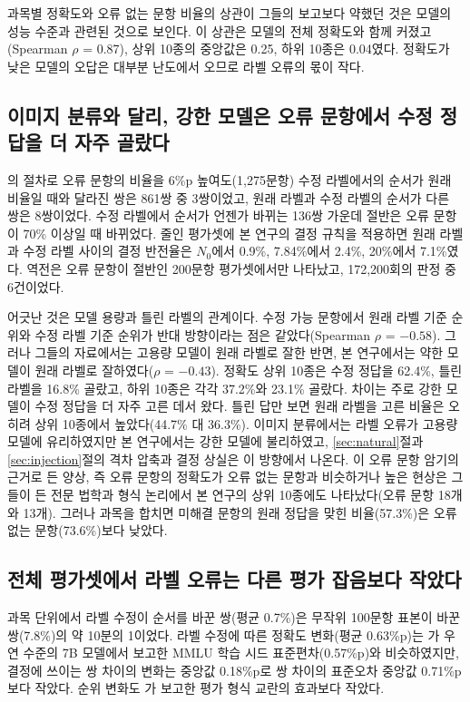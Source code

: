 \documentclass[11pt]{article}
\begin{document}
과목별 정확도와 오류 없는 문항 비율의 상관이 그들의 보고보다 약했던 것은 모델의 성능 수준과 관련된 것으로 보인다. 이 상관은 모델의 전체 정확도와 함께 커졌고(Spearman $\rho$ = 0.87), 상위 10종의 중앙값은 0.25, 하위 10종은 0.04였다. 정확도가 낮은 모델의 오답은 대부분 난도에서 오므로 라벨 오류의 몫이 작다.

\subsection{이미지 분류와 달리, 강한 모델은 오류 문항에서 수정 정답을 더 자주 골랐다}
\label{sec:capacity}

\citet{northcutt2021pervasive}의 절차로 오류 문항의 비율을 6\%p 높여도(1,275문항) 수정 라벨에서의 순서가 원래 비율일 때와 달라진 쌍은 861쌍 중 3쌍이었고, 원래 라벨과 수정 라벨의 순서가 다른 쌍은 8쌍이었다. 수정 라벨에서 순서가 언젠가 바뀌는 136쌍 가운데 절반은 오류 문항이 70\% 이상일 때 바뀌었다. 줄인 평가셋에 본 연구의 결정 규칙을 적용하면 원래 라벨과 수정 라벨 사이의 결정 반전율은 $N_0$에서 0.9\%, 7.84\%에서 2.4\%, 20\%에서 7.1\%였다. 역전은 오류 문항이 절반인 200문항 평가셋에서만 나타났고, 172,200회의 판정 중 6건이었다.

어긋난 것은 모델 용량과 틀린 라벨의 관계이다. 수정 가능 문항에서 원래 라벨 기준 순위와 수정 라벨 기준 순위가 반대 방향이라는 점은 같았다(Spearman $\rho$ = $-0.58$). 그러나 그들의 자료에서는 고용량 모델이 원래 라벨로 잘한 반면, 본 연구에서는 약한 모델이 원래 라벨로 잘하였다($\rho$ = $-0.43$). 정확도 상위 10종은 수정 정답을 62.4\%, 틀린 라벨을 16.8\% 골랐고, 하위 10종은 각각 37.2\%와 23.1\% 골랐다. 차이는 주로 강한 모델이 수정 정답을 더 자주 고른 데서 왔다. 틀린 답만 보면 원래 라벨을 고른 비율은 오히려 상위 10종에서 높았다(44.7\% 대 36.3\%). 이미지 분류에서는 라벨 오류가 고용량 모델에 유리하였지만 본 연구에서는 강한 모델에 불리하였고, \ref{sec:natural}절과 \ref{sec:injection}절의 격차 압축과 결정 상실은 이 방향에서 나온다. \citet{gema-etal-2025-done}이 오류 문항 암기의 근거로 든 양상, 즉 오류 문항의 정확도가 오류 없는 문항과 비슷하거나 높은 현상은 그들이 든 전문 법학과 형식 논리에서 본 연구의 상위 10종에도 나타났다(오류 문항 18개와 13개). 그러나 과목을 합치면 미해결 문항의 원래 정답을 맞힌 비율(57.3\%)은 오류 없는 문항(73.6\%)보다 낮았다.

\subsection{전체 평가셋에서 라벨 오류는 다른 평가 잡음보다 작았다}

과목 단위에서 라벨 수정이 순서를 바꾼 쌍(평균 0.7\%)은 무작위 100문항 표본이 바꾼 쌍(7.8\%)의 약 10분의 1이었다. 라벨 수정에 따른 정확도 변화(평균 0.63\%p)는 \citet{madaan2024variance}가 우연 수준의 7B 모델에서 보고한 MMLU 학습 시드 표준편차(0.57\%p)와 비슷하였지만, 결정에 쓰이는 쌍 차이의 변화는 중앙값 0.18\%p로 쌍 차이의 표준오차 중앙값 0.71\%p보다 작았다. 순위 변화도 \citet{alzahrani-etal-2024-benchmarks}가 보고한 평가 형식 교란의 효과보다 작았다.
\end{document}
